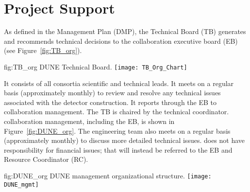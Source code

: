 \section{Project Support}
\label{sec:fdsp-coord-supp}

As defined in the  Management Plan (DMP), the 
Technical Board (TB) generates and recommends technical decisions to the 
collaboration executive board (EB) (see Figure~\ref{fig:TB_org}).
\begin{dunefigure}{fig:TB_org}
  {DUNE Technical Board.}
 \texttt{[image: TB\_Org\_Chart]}
\end{dunefigure}

It consists of all consortia scientific and technical leads. It meets
on a regular basis (approximately monthly) to review and resolve any
technical issues associated with the detector construction. It reports
through the EB to collaboration management. The  TB
is chaired by the technical coordinator.  collaboration
management, including the EB, is shown in Figure~\ref{fig:DUNE_org}. The
 engineering team also meets on a regular basis (approximately monthly)
to discuss more detailed technical issues.  does not have
responsibility for financial issues; that will instead be referred to
the EB and Resource Coordinator (RC).

\begin{dunefigure}{fig:DUNE_org}
  {DUNE management organizational structure.}
 \texttt{[image: DUNE\_mgmt]}
\end{dunefigure}

